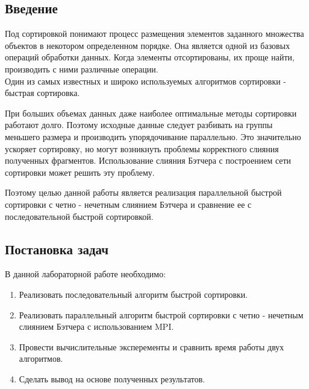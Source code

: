 \documentclass[a4paper]{report}
\begin{document}
\begin{center}
\section*{Введение}
\end{center}
\par Под сортировкой понимают процесс размещения элементов заданного множества объектов в некотором определенном порядке. Она является одной из базовых операций обработки данных.
Когда элементы отсортированы, их проще найти, производить с ними различные операции. \\
Один из самых известных и широко используемых алгоритмов сортировки - быстрая сортировка.
\par При больших объемах данных даже наиболее оптимальные методы
сортировки работают долго. Поэтому исходные данные следует разбивать
на группы меньшего размера и производить упорядочивание параллельно. Это значительно
ускоряет сортировку, но могут возникнуть проблемы корректного слияния полученных
фрагментов. Использование слияния Бэтчера с построением сети сортировки может решить эту
проблему. 
\par Поэтому целью данной работы является реализация параллельной быстрой сортировки с четно - нечетным слиянием Бэтчера и сравнение ее с последовательной быстрой сортировкой.
\newpage

\begin{center}
\section*{Постановка задач}
\end{center}
В данной лабораторной работе необходимо:
\begin{enumerate}
\item Реализовать последовательный алгоритм быстрой сортировки.
\item Реализовать параллельный алгоритм быстрой сортировки с четно - нечетным слиянием Бэтчера с использованием MPI.
\item Провести вычислительные эксперементы и сравнить время работы двух алгоритмов.
\item Сделать вывод на основе полученных результатов.
\end{enumerate}
\newpage
\end{document}
